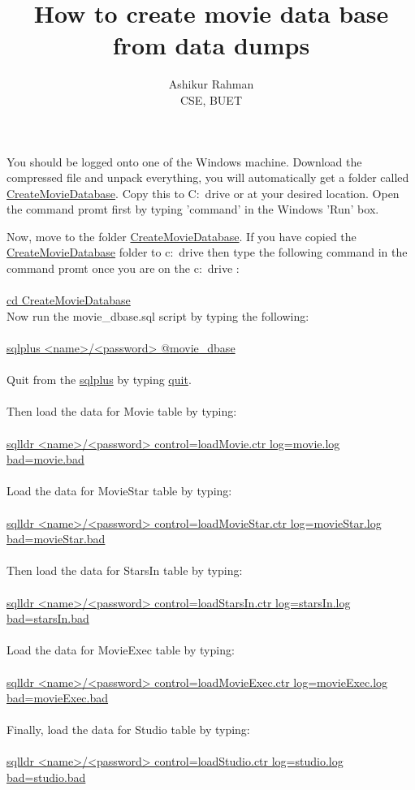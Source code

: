 \documentclass[11pt]{article}
\begin{document}
\title{How to create movie data base from data dumps}
\author{Ashikur Rahman\\
CSE, BUET}
\maketitle



You should be logged onto one of the Windows machine. Download the compressed file and unpack everything, you will automatically
get a folder called \url{CreateMovieDatabase}. Copy this to C:\ drive or at your desired location.
Open the command promt first by typing 'command' in the Windows 'Run' box.

 Now, move to the folder \url{CreateMovieDatabase}. If you have 
copied the \url{CreateMovieDatabase} folder to c:\ drive then type
the following command in the command promt once you are on the c:\ drive :
\\
\\
\noindent   \url{cd CreateMovieDatabase}
\\

Now run the movie\_dbase.sql script by typing the following:
\\
\\
\noindent   \url{sqlplus <name>/<password> @movie_dbase}
\\
\\
Quit from the \url{sqlplus} by typing \url{quit}.
\\
\\
Then load the data for Movie table by typing:
\\
\\
\noindent   \url{sqlldr <name>/<password> control=loadMovie.ctr log=movie.log bad=movie.bad}
\\
\\
Load the data for MovieStar table by typing:
\\
\\
\noindent   \url{sqlldr <name>/<password> control=loadMovieStar.ctr log=movieStar.log bad=movieStar.bad}
\\
\\
Then load the data for StarsIn table by typing:
\\
\\
\noindent   \url{sqlldr <name>/<password> control=loadStarsIn.ctr log=starsIn.log bad=starsIn.bad}
\\
\\
Load the data for MovieExec table by typing:
\\
\\
\noindent   \url{sqlldr <name>/<password> control=loadMovieExec.ctr log=movieExec.log bad=movieExec.bad}
\\
\\
Finally, load the data for Studio table by typing:
\\
\\
\noindent   \url{sqlldr <name>/<password> control=loadStudio.ctr log=studio.log bad=studio.bad}
\end{document}
